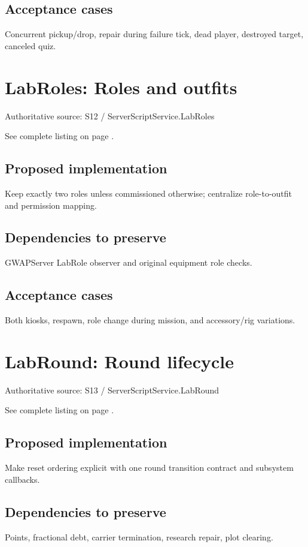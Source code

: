 \subsection{Acceptance cases}
Concurrent pickup/\allowbreak{}drop, repair during failure tick, dead player, destroyed target, canceled quiz.\allowbreak{}

\section{LabRoles: Roles and outfits}
Authoritative source: S12 /\allowbreak{} ServerScriptService.\allowbreak{}LabRoles

See complete listing on page \pageref{src:S12}.

\subsection{Proposed implementation}
Keep exactly two roles unless commissioned otherwise; centralize role-to-outfit and permission mapping.\allowbreak{}

\subsection{Dependencies to preserve}
GWAPServer LabRole observer and original equipment role checks.\allowbreak{}

\subsection{Acceptance cases}
Both kiosks, respawn, role change during mission, and accessory/\allowbreak{}rig variations.\allowbreak{}

\section{LabRound: Round lifecycle}
Authoritative source: S13 /\allowbreak{} ServerScriptService.\allowbreak{}LabRound

See complete listing on page \pageref{src:S13}.

\subsection{Proposed implementation}
Make reset ordering explicit with one round transition contract and subsystem callbacks.\allowbreak{}

\subsection{Dependencies to preserve}
Points, fractional debt, carrier termination, research repair, plot clearing.\allowbreak{}


